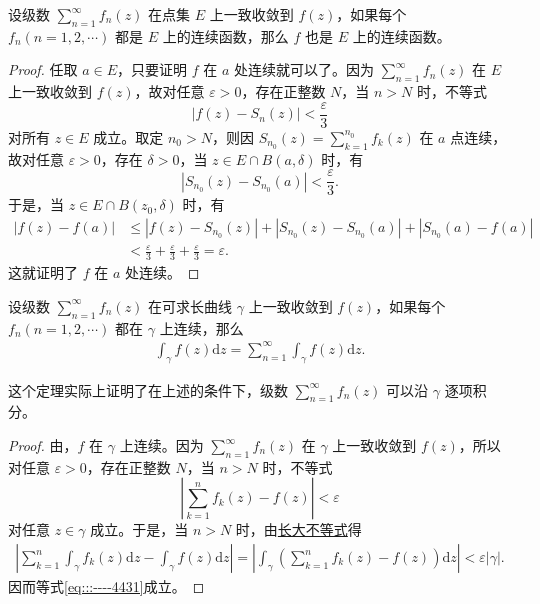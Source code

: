 \documentclass[../../main.tex]{subfiles}%
\begin{document}
\begin{theorem}\label{theorem:定理4.1.4}
设级数 \( \sum_{n=1}^{\infty} f_n(z) \) 在点集 \( E \) 上一致收敛到 \( f(z) \)，如果每个 \( f_n (n = 1, 2, \cdots) \) 都是 \( E \) 上的连续函数，那么 \( f \) 也是 \( E \) 上的连续函数。
\end{theorem}
\begin{proof}

任取 \( a \in E \)，只要证明 \( f \) 在 \( a \) 处连续就可以了。因为 \( \sum_{n=1}^{\infty} f_n(z) \) 在 \( E \) 上一致收敛到 \( f(z) \)，故对任意 \( \varepsilon > 0 \)，存在正整数 \( N \)，当 \( n > N \) 时，不等式
\[
|f(z) - S_n(z)| < \frac{\varepsilon}{3}
\]
对所有 \( z \in E \) 成立。取定 \( n_0 > N \)，则因 \( S_{n_0}(z) = \sum_{k=1}^{n_0} f_k(z) \) 在 \( a \) 点连续，故对任意 \( \varepsilon > 0 \)，存在 \( \delta > 0 \)，当 \( z \in E \cap B(a, \delta) \) 时，有
\[
|S_{n_0}(z) - S_{n_0}(a)| < \frac{\varepsilon}{3}.
\]
于是，当 \( z \in E \cap B(z_0, \delta) \) 时，有
\begin{align*}
|f(z) - f(a)| &\leqslant |f(z) - S_{n_0}(z)| + |S_{n_0}(z) - S_{n_0}(a)| + |S_{n_0}(a) - f(a)| \\
&< \frac{\varepsilon}{3} + \frac{\varepsilon}{3} + \frac{\varepsilon}{3}= \varepsilon.
\end{align*}
这就证明了 \( f \) 在 \( a \) 处连续。

\end{proof}

\begin{theorem}\label{theorem:定理4.1.5}
设级数 \( \sum_{n=1}^{\infty} f_n(z) \) 在可求长曲线 \( \gamma \) 上一致收敛到 \( f(z) \)，如果每个 \( f_n (n = 1, 2, \cdots) \) 都在 \( \gamma \) 上连续，那么
\begin{align}
\int_{\gamma} f(z) \mathrm{d}z = \sum_{n=1}^{\infty} \int_{\gamma} f(z) \mathrm{d}z.\label{eq:::----4431}
\end{align}
\end{theorem}
\begin{remark}
这个定理实际上证明了在上述的条件下，级数 \( \sum_{n=1}^{\infty} f_n(z) \) 可以沿 \( \gamma \) 逐项积分。
\end{remark}
\begin{proof}

由，\( f \) 在 \( \gamma \) 上连续。因为 \( \sum_{n=1}^{\infty} f_n(z) \) 在 \( \gamma \) 上一致收敛到 \( f(z) \)，所以对任意 \( \varepsilon > 0 \)，存在正整数 \( N \)，当 \( n > N \) 时，不等式
\[
\left| \sum_{k=1}^{n} f_k(z) - f(z) \right| < \varepsilon
\]
对任意 \( z \in \gamma \) 成立。于是，当 \( n > N \) 时，由\hyperref[theorem:长大不等式]{长大不等式}得
\begin{align*}
\left| \sum_{k=1}^{n} \int_{\gamma} f_k(z) \mathrm{d}z - \int_{\gamma} f(z) \mathrm{d}z \right| = \left| \int_{\gamma} \left( \sum_{k=1}^{n} f_k(z) - f(z) \right) \mathrm{d}z \right| < \varepsilon |\gamma|.
\end{align*}
因而等式\eqref{eq:::----4431}成立。

\end{proof}
\end{document}
